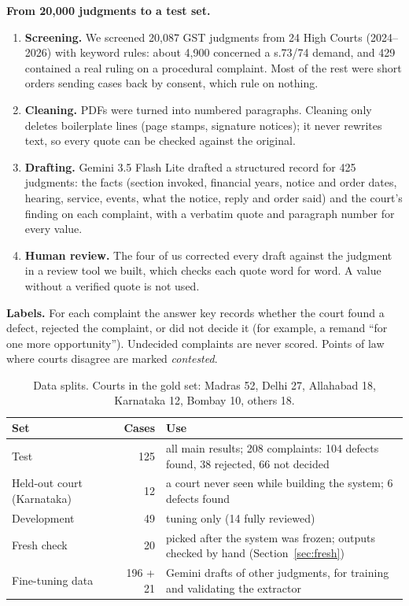 \documentclass[10pt,a4paper]{article}
\begin{document}
\textbf{From 20,000 judgments to a test set.}
\begin{enumerate}
\item \textbf{Screening.} We screened 20,087 GST judgments from 24 High Courts (2024--2026) with keyword rules: about 4,900 concerned a s.73/74 demand, and 429 contained a real ruling on a procedural complaint. Most of the rest were short orders sending cases back by consent, which rule on nothing.
\item \textbf{Cleaning.} PDFs were turned into numbered paragraphs. Cleaning only deletes boilerplate lines (page stamps, signature notices); it never rewrites text, so every quote can be checked against the original.
\item \textbf{Drafting.} Gemini 3.5 Flash Lite drafted a structured record for 425 judgments: the facts (section invoked, financial years, notice and order dates, hearing, service, events, what the notice, reply and order said) and the court's finding on each complaint, with a verbatim quote and paragraph number for every value.
\item \textbf{Human review.} The four of us corrected every draft against the judgment in a review tool we built, which checks each quote word for word. A value without a verified quote is not used.
\end{enumerate}

\textbf{Labels.} For each complaint the answer key records whether the court found a defect, rejected the complaint, or did not decide it (for example, a remand ``for one more opportunity''). Undecided complaints are never scored. Points of law where courts disagree are marked \emph{contested}.

\begin{table}[H]
\centering\small
\begin{tabularx}{\textwidth}{l r Y}
\toprule
Set & Cases & Use \\
\midrule
Test & 125 & all main results; 208 complaints: 104 defects found, 38 rejected, 66 not decided \\
Held-out court (Karnataka) & 12 & a court never seen while building the system; 6 defects found \\
Development & 49 & tuning only (14 fully reviewed) \\
Fresh check & 20 & picked after the system was frozen; outputs checked by hand (Section~\ref{sec:fresh}) \\
Fine-tuning data & 196 + 21 & Gemini drafts of other judgments, for training and validating the extractor \\
\bottomrule
\end{tabularx}
\caption{Data splits. Courts in the gold set: Madras 52, Delhi 27, Allahabad 18, Karnataka 12, Bombay 10, others 18.}
\end{table}
\end{document}
